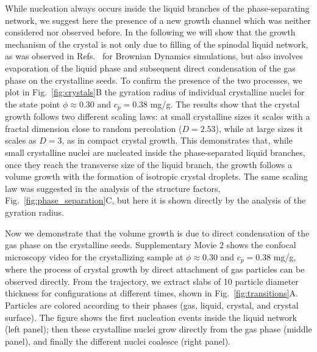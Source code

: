\documentclass[12pt]{article}
\begin{document}
While nucleation always occurs inside the liquid branches of the phase-separating network, we suggest here the presence of a new growth channel
which was neither considered nor observed before. In the following we will show that the growth mechanism of the crystal is not only due to filling of the spinodal liquid network, as was observed in Refs.~\cite{fortini2008crystallization,perez2011pathways} for Brownian Dynamics simulations, but also involves 
evaporation of the liquid phase and subsequent direct condensation of the gas phase on the crystalline seeds. 
To confirm the presence of the two processes, we plot in Fig.~\ref{fig:crystals}B the gyration radius of individual crystalline nuclei for the state point 
$\phi\approx 0.30$ and $c_p=0.38$ mg/g. The results show that the crystal growth follows two different scaling laws: at small crystalline sizes it scales with 
a fractal dimension close to random percolation ($D=2.53$), while at large sizes it scales as $D=3$, as in compact crystal growth. This demonstrates that, while 
small crystalline nuclei are nucleated inside the phase-separated liquid branches, once they reach the transverse size of the liquid branch, the growth 
follows a volume growth with the formation of isotropic crystal droplets. The same scaling law was suggested in the analysis of the
structure factors, Fig.~\ref{fig:phase_separation}C, but here it is shown directly by the analysis of the gyration radius. 

Now we demonstrate that the volume growth is due to direct condensation of the gas phase on the crystalline seeds.
Supplementary Movie 2 shows the confocal microscopy video for the crystallizing sample at $\phi\approx 0.30$ and $c_p=0.38$ mg/g,
where the process of crystal growth by direct attachment of gas particles can be observed directly. 
From the trajectory, we extract slabs of 10 particle diameter thickness for configurations at different times, shown in Fig.~\ref{fig:transitions}A. 
Particles are colored according to their phases (gas, liquid, crystal, and crystal surface). The figure shows the first nucleation 
events inside the liquid network (left panel); then these crystalline nuclei grow directly from the gas phase (middle panel), and finally
the different nuclei coalesce (right panel). 

\end{document}
